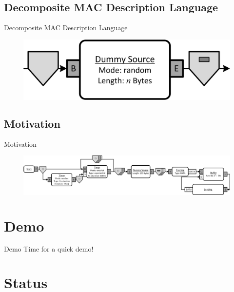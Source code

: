 \documentclass{beamer}
\begin{document}
\subsection{Decomposite MAC Description Language}
\begin{frame}{Decomposite MAC Description Language}
	\begin{figure}
 		\includegraphics[width=\linewidth]{dummy_source.png}
 		\label{fig:dummy}
	\end{figure}
\end{frame}

\subsection{Motivation}
\begin{frame}{Motivation}
	\begin{figure}
 		\includegraphics[width=\linewidth]{pure_aloha.png}
 		\label{fig:aloha}
	\end{figure}
\end{frame}

\section{Demo}
\begin{frame}{Demo}
Time for a quick demo!
\end{frame}

\section{Status}
\end{document}
